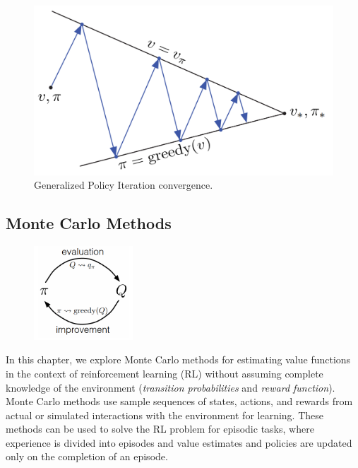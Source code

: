 \documentclass[../xlapes02]{subfiles}
\begin{document}
    \begin{figure}[h!]
        \centering
        \begin{minipage}[b]{0.5\textwidth}
            \includegraphics[width=\textwidth]{image/gpi2}
            \caption{Generalized Policy Iteration convergence.}
            \label{fig:gpi}
        \end{minipage}
    \end{figure}

    \subsection{Monte Carlo Methods}\label{subsec:monte-carlo-methods}
    \begin{figure}
        \begin{center}
            \includegraphics[width=0.33\textwidth]{image/mc-evaluation-improvement}
        \end{center}
    \end{figure}

    In this chapter, we explore Monte Carlo methods for estimating value functions in the context of reinforcement learning (RL) without assuming complete knowledge of the environment (\emph{transition probabilities} and \emph{reward function}). Monte Carlo methods use sample sequences of states, actions, and rewards from actual or simulated interactions with the environment for learning. These methods can be used to solve the RL problem for episodic tasks, where experience is divided into episodes and value estimates and policies are updated only on the completion of an episode.
\end{document}
